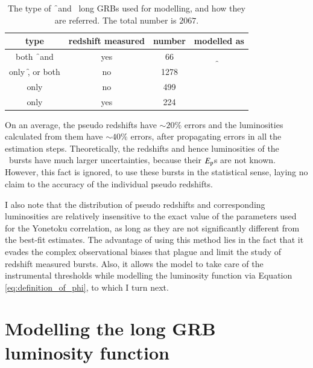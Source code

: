 \begin{table}
\caption[Categories of long GRBs used for modelling LF]{The type of \f\ and \s\ long GRBs used for modelling, and how they are referred. The total number is $2067$.}
\label{tab:GRB_numbers--long}
\begin{center}
\begin{tabular}{|c|c|c|c|}
\hline 
type & redshift measured & number & modelled as\\
\hline 
\hline 
both \f\ and \s & yes & 66 & \multirow{2}{*}{\f}\\
\cline{1-3} 
only \f, or both & no & 1278 & \\
\hline 
only \s & no & 499 & \multirow{2}{*}{\s}\\
\cline{1-3} 
only \s & yes & 224 & \\
\hline 
\end{tabular}
\end{center}
\end{table}


On an average, the pseudo redshifts have $ \sim 20 \% $ errors and the luminosities calculated from them have $ \sim 40 \% $ errors, after propagating errors in all the estimation steps. Theoretically, the redshifts and hence luminosities of the \s\ bursts have much larger uncertainties, because their $E_{\rm p}$s are not known. However, this fact is ignored, to use these bursts in the statistical sense, laying no claim to the accuracy of the individual pseudo redshifts.

I also note that the distribution of pseudo redshifts and corresponding luminosities are relatively insensitive to the exact value of the parameters used for the Yonetoku correlation, as long as they are not significantly different from the best-fit estimates. The advantage of using this method lies in the fact that it evades the complex observational biases that plague and limit the study of redshift measured bursts. Also, it allows the model to take care of the instrumental thresholds while modelling the luminosity function via Equation \ref{eq:definition_of_phi}, to which I turn next.


\section{Modelling the long GRB luminosity function}
\label{sec:Modelling_the_GRB_LF--long}


